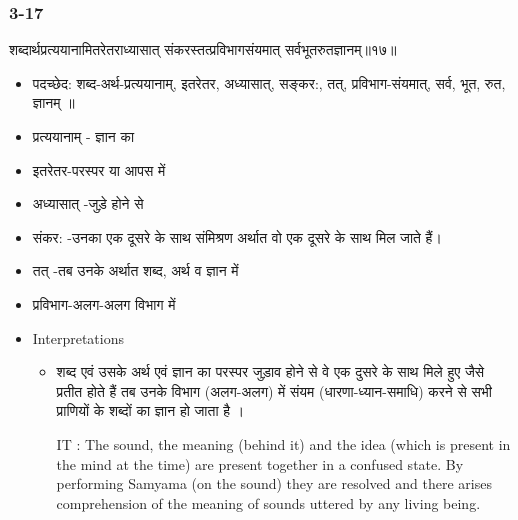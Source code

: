 \begin{frame}[fragile]\frametitle{3-17}
\begin{sanskrit}
शब्दार्थप्रत्ययानामितरेतराध्यासात् संकरस्तत्प्रविभागसंयमात् सर्वभूतरुतज्ञानम्॥१७॥
\end{sanskrit}

	\begin{itemize}
	\item पदच्छेद:  शब्द-अर्थ-प्रत्ययानाम्, इतरेतर, अध्यासात्‌, सङ्कर:, तत्, प्रविभाग-संयमात्, सर्व, भूत, रुत, ज्ञानम् ॥
	\item प्रत्ययानाम् - ज्ञान का
	\item इतरेतर-परस्पर या आपस में
	\item अध्यासात् -जुड़े होने से
	\item संकर: -उनका एक दूसरे के साथ संमिश्रण अर्थात वो एक दूसरे के साथ मिल जाते हैं।
	\item तत् -तब उनके अर्थात शब्द, अर्थ व ज्ञान में
	\item प्रविभाग-अलग-अलग विभाग में
	\item Interpretations
		\begin{itemize}	
		\item शब्द एवं उसके अर्थ एवं ज्ञान का परस्पर जुड़ाव होने से वे एक दुसरे के साथ मिले हुए जैसे प्रतीत होते हैं तब उनके विभाग (अलग-अलग) में संयम (धारणा-ध्यान-समाधि) करने से सभी प्राणियों के शब्दों का ज्ञान हो जाता है ।
		\item [IT]: The sound, the meaning (behind it) and the idea (which is present in the mind at the time) are present together in a confused state. By performing Samyama (on the sound) they are resolved and there arises comprehension of the meaning of sounds uttered by any living being.
		\end{itemize}
	\end{itemize}
\end{frame}

